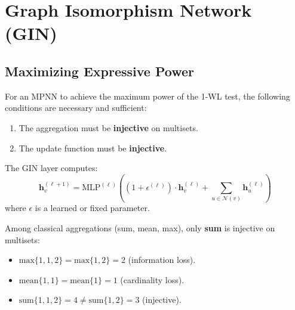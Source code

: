 \section{Graph Isomorphism Network (GIN)}

\subsection{Maximizing Expressive Power}

\begin{theorem}[GIN --- Xu et al., 2019]
For an MPNN to achieve the maximum power of the 1-WL test, the following
conditions are necessary and sufficient:
\begin{enumerate}
    \item The aggregation must be \textbf{injective} on multisets.
    \item The update function must be \textbf{injective}.
\end{enumerate}
\end{theorem}

\begin{definition}
The GIN layer computes:
\[
    \mathbf{h}_v^{(\ell+1)} = \text{MLP}^{(\ell)}\!\left((1 + \epsilon^{(\ell)})
    \cdot \mathbf{h}_v^{(\ell)} + \sum_{u \in \mathcal{N}(v)}
    \mathbf{h}_u^{(\ell)}\right)
\]
where $\epsilon$ is a learned or fixed parameter.
\end{definition}

\begin{proposition}
Among classical aggregations (sum, mean, max), only \textbf{sum} is injective
on multisets:
\begin{itemize}
    \item $\text{max}\{1, 1, 2\} = \text{max}\{1, 2\} = 2$ (information loss).
    \item $\text{mean}\{1, 1\} = \text{mean}\{1\} = 1$ (cardinality loss).
    \item $\text{sum}\{1, 1, 2\} = 4 \neq \text{sum}\{1, 2\} = 3$ (injective).
\end{itemize}
\end{proposition}

